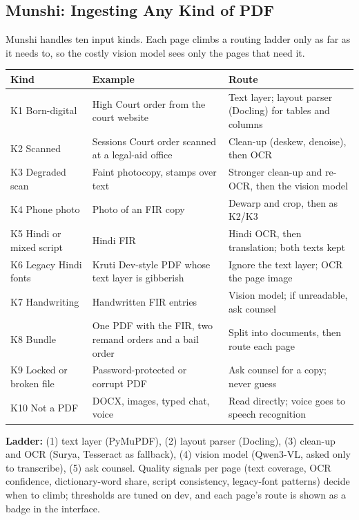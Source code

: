 \documentclass[10pt,a4paper]{article}
\begin{document}
\subsection{Munshi: Ingesting Any Kind of PDF}

Munshi handles ten input kinds. Each page climbs a routing ladder only as far as it needs to, so the costly vision model sees only the pages that need it.

{\small
\begin{xltabular}{\linewidth}{@{}>{\raggedright\arraybackslash{}\hsize}X>{\raggedright\arraybackslash{}\hsize}X>{\raggedright\arraybackslash{}\hsize}X@{}}
\toprule
\textbf{Kind} & \textbf{Example} & \textbf{Route} \\
\midrule
\endhead
K1 Born-digital & High Court order from the court website & Text layer; layout parser (Docling) for tables and columns \\
K2 Scanned & Sessions Court order scanned at a legal-aid office & Clean-up (deskew, denoise), then OCR \\
K3 Degraded scan & Faint photocopy, stamps over text & Stronger clean-up and re-OCR, then the vision model \\
K4 Phone photo & Photo of an FIR copy & Dewarp and crop, then as K2/K3 \\
K5 Hindi or mixed script & Hindi FIR & Hindi OCR, then translation; both texts kept \\
K6 Legacy Hindi fonts & Kruti Dev-style PDF whose text layer is gibberish & Ignore the text layer; OCR the page image \\
K7 Handwriting & Handwritten FIR entries & Vision model; if unreadable, ask counsel \\
K8 Bundle & One PDF with the FIR, two remand orders and a bail order & Split into documents, then route each page \\
K9 Locked or broken file & Password-protected or corrupt PDF & Ask counsel for a copy; never guess \\
K10 Not a PDF & DOCX, images, typed chat, voice & Read directly; voice goes to speech recognition \\
\bottomrule
\end{xltabular}}

\textbf{Ladder:} (1) text layer (PyMuPDF), (2) layout parser (Docling), (3) clean-up and OCR (Surya, Tesseract as fallback), (4) vision model (Qwen3-VL, asked only to transcribe), (5) ask counsel. Quality signals per page (text coverage, OCR confidence, dictionary-word share, script consistency, legacy-font patterns) decide when to climb; thresholds are tuned on dev, and each page's route is shown as a badge in the interface.
\end{document}
